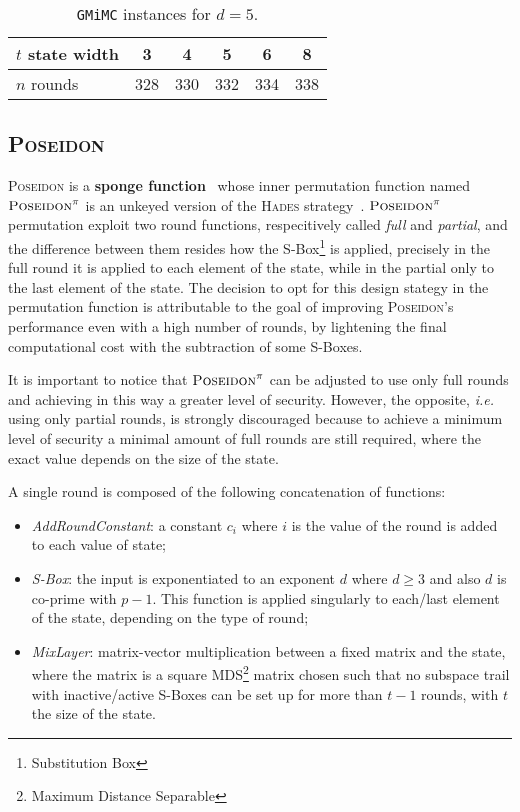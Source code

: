 \documentclass[12pt, a4paper]{report}
\begin{document}
\begin{table}[H]
  \caption{\texttt{GMiMC} instances for $d = 5$.}\label{tab:gmimcinstances}
  \begin{center}
    \begin{tabular}{|l|c|c|c|c|c|}
      \hline
      $t$ state width & 3 & 4 & 5 & 6 & 8 \\
      \hline
      $n$ rounds & 328 & 330 & 332 & 334 & 338 \\
      \hline
    \end{tabular}
  \end{center}
\end{table}
\subsection{\textsc{Poseidon}}\label{subsec:poseidon}

\textsc{Poseidon} is a \textbf{sponge function}~\cite{sponge} whose inner permutation function named $\textsc{Poseidon}^\pi$ is an unkeyed version of the \textsc{Hades} strategy~\cite{hades}.
$\textsc{Poseidon}^\pi$ permutation exploit two round functions, respecitively called \textit{full} and \textit{partial}, and the difference between them resides how the S-Box\footnote{Substitution Box} is applied, precisely in the full round it is applied to each element of the state, while in the partial only to the last element of the state. 
The decision to opt for this design stategy in the permutation function is attributable to the goal of improving \textsc{Poseidon}'s performance even with a high number of rounds, by lightening the final computational cost with the subtraction of some S-Boxes.
\begin{note}
It is important to notice that $\textsc{Poseidon}^\pi$ can be adjusted to use only full rounds and achieving in this way a greater level of security.
However, the opposite, \textsl{i.e.} using only partial rounds, is strongly discouraged because to achieve a minimum level of security a minimal amount of full rounds are still required, where the exact value depends on the size of the state.
\end{note}

A single round is composed of the following concatenation of functions:
\begin{itemize}
  \item \textit{AddRoundConstant}: a constant $c_i$ where $i$ is the value of the round is added to each value of state;
  \item \textit{S-Box}: the input is exponentiated to an exponent $d$ where $d \ge 3$ and also $d$ is co-prime with $p-1$. This function is applied singularly to each/last element of the state, depending on the type of round;
  \item \textit{MixLayer}: matrix-vector multiplication between a fixed matrix and the state, where the matrix is a square MDS\footnote{Maximum Distance Separable} matrix chosen such that no subspace trail with inactive/active S-Boxes can be set up for more than $t-1$ rounds, with $t$ the size of the state.
\end{itemize}
\end{document}
